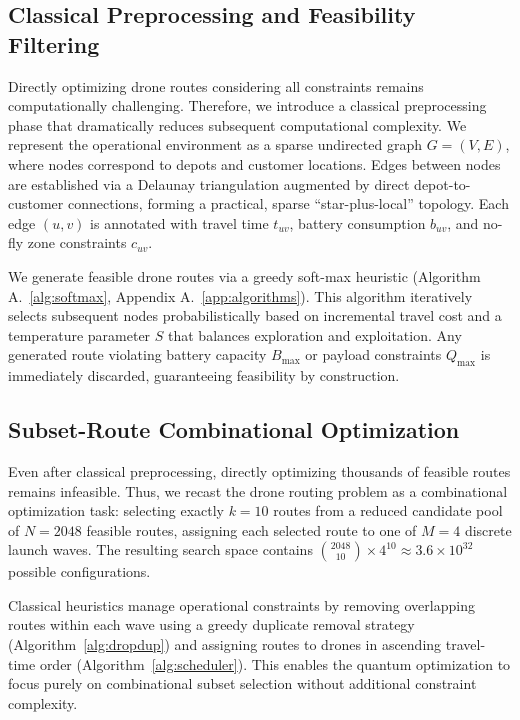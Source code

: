 \subsection{Classical Preprocessing and Feasibility Filtering}

Directly optimizing drone routes considering all constraints remains computationally challenging. Therefore, we introduce a classical preprocessing phase that dramatically reduces subsequent computational complexity. We represent the operational environment as a sparse undirected graph $G=(V,E)$, where nodes correspond to depots and customer locations. Edges between nodes are established via a Delaunay triangulation augmented by direct depot-to-customer connections, forming a practical, sparse ``star-plus-local'' topology. Each edge $(u,v)$ is annotated with travel time $t_{uv}$, battery consumption $b_{uv}$, and no-fly zone constraints $c_{uv}$.

We generate feasible drone routes via a greedy soft-max heuristic (Algorithm A.~\ref{alg:softmax}, Appendix A.~\ref{app:algorithms}). This algorithm iteratively selects subsequent nodes probabilistically based on incremental travel cost and a temperature parameter $S$ that balances exploration and exploitation. Any generated route violating battery capacity $B_{\max}$ or payload constraints $Q_{\max}$ is immediately discarded, guaranteeing feasibility by construction.

\subsection{Subset-Route Combinational Optimization}

Even after classical preprocessing, directly optimizing thousands of feasible routes remains infeasible. Thus, we recast the drone routing problem as a combinational optimization task: selecting exactly $k=10$ routes from a reduced candidate pool of $N=2048$ feasible routes, assigning each selected route to one of $M=4$ discrete launch waves. The resulting search space contains $\binom{2048}{10} \times 4^{10} \approx 3.6 \times 10^{32}$ possible configurations.

Classical heuristics manage operational constraints by removing overlapping routes within each wave using a greedy duplicate removal strategy (Algorithm~\ref{alg:dropdup}) and assigning routes to drones in ascending travel-time order (Algorithm~\ref{alg:scheduler}). This enables the quantum optimization to focus purely on combinational subset selection without additional constraint complexity.

